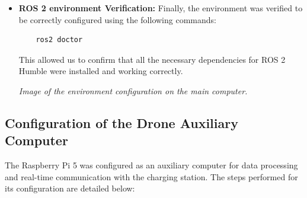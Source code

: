 \begin{itemize}
    \item \textbf{ROS 2 environment Verification:} 
    Finally, the environment was verified to be correctly configured using the following commands:
    \begin{verbatim}
    ros2 doctor
    \end{verbatim}
    This allowed us to confirm that all the necessary dependencies for ROS 2 Humble were installed and working correctly.    
    \begin{center} 
        \textit{Image of the environment configuration on the main computer.} 
    \end{center}
\end{itemize}


\subsection{Configuration of the Drone Auxiliary Computer} 
The Raspberry Pi 5 was configured as an auxiliary computer for data processing and real-time communication with the charging station. The steps performed for its configuration are detailed below:

